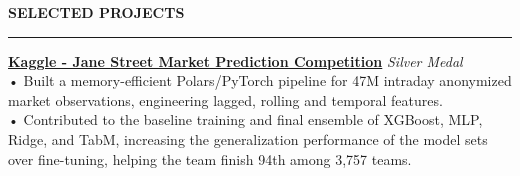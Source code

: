 \documentclass{resume} %
\renewcommand{\sectionskip}{\vspace{0.10cm}}        %
\renewcommand{\sectionlineskip}{\vspace{0.10cm}}
\renewenvironment{rSection}[1]{
\sectionskip
\textcolor{UC San Diego Blue}{\textbf{\large\bfseries\MakeUppercase{#1}}}

\sectionlineskip
\hrule
\begin{list}{}{
\setlength{\leftmargin}{0em}
}
\item[]
}{
\end{list}
}
\begin{document}
\begin{rSection}{SELECTED PROJECTS}

\noindent
\href{https://github.com/YuankaiTao-super/Kaggle2024-Jane-Street-Real-Time-Market-Data-Forecasting}{\textbf{Kaggle - Jane Street Market Prediction Competition}} \hfill \textit{Silver Medal}\\
• Built a memory-efficient Polars/PyTorch pipeline for 47M intraday anonymized market observations, engineering lagged, rolling and temporal features.\\[1.5pt]
• Contributed to the baseline training and final ensemble of XGBoost, MLP, Ridge, and TabM, increasing the generalization performance of the model sets over fine-tuning, helping the team finish 94th among 3,757 teams.




\end{rSection}
\end{document}
